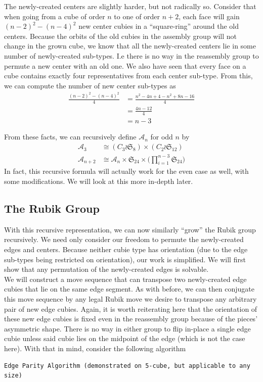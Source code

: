 \documentclass[10pt,letterpaper]{report}
\begin{document}
The newly-created centers are slightly harder, but not radically so.  Consider that when going from a cube of order $n$ to one of order $n+2$, each face will gain $(n-2)^2 - (n-4)^2$ new center cubies in a ``square-ring'' around the old centers.  Because the orbits of the old cubies in the assembly group will not change in the grown cube, we know that all the newly-created centers lie in some number of newly-created sub-types.  I.e there is no way in the reassembly group to permute a new center with an old one.  We also have seen that every face on a cube contains exactly four representatives from each center sub-type.  From this, we can compute the number of new center sub-types as
\begin{align*}
\frac{(n-2)^2 - (n-4)^2}{4}
&= \frac{n^2 - 4n + 4 - n^2 + 8n - 16}{4} \\
&= \frac{4n -12}{4} \\
&= n - 3
\end{align*}

From these facts, we can recursively define $\mathcal{A}_n$ for odd $n$ by
\begin{align*}
\mathcal{A}_3 &\cong (C_3 \wr \mathfrak{S}_8) \times (C_2 \wr \mathfrak{S}_{12}) \\
\mathcal{A}_{n+2} &\cong \mathcal{A}_n \times \mathfrak{S}_{24} \times \Big( \prod_{i=1}^{n-3} \mathfrak{S}_{24} \Big)
\end{align*}
In fact, this recursive formula will actually work for the even case as well, with some modifications.  We will look at this more in-depth later.

\subsection{The Rubik Group}
With this recursive representation, we can now similarly ``grow'' the Rubik group recursively.  We need only consider our freedom to permute the newly-created edges and centers.  Because neither cubie type has orientation (due to the edge sub-types being restricted on orientation), our work is simplified.  We will first show that any permutation of the newly-created edges is solvable. \\

We will construct a move sequence that can transpose two newly-created edge cubies that lie on the same edge segment.  As with before, we can then conjugate this move sequence by any legal Rubik move we desire to transpose any arbitrary pair of new edge cubies.  Again, it is worth reiterating here that the orientation of these new edge cubies is fixed even in the reassembly group because of the pieces' asymmetric shape.  There is no way in either group to flip in-place a single edge cubie unless said cubie lies on the midpoint of the edge (which is not the case here).  With that in mind, consider the following algorithm

\begin{verbatim}
Edge Parity Algorithm (demonstrated on 5-cube, but applicable to any size)

\end{verbatim}
\end{document}
